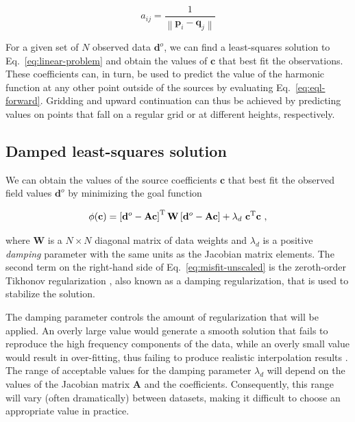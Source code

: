 \begin{equation}
    a_{ij} = \frac{1}{\left\lVert\mathbf{p}_i - \mathbf{q}_j\right\rVert}
\end{equation}

For a given set of $N$ observed data $\mathbf{d}^o$,
we can find a least-squares solution to
Eq.~\ref{eq:linear-problem} and obtain the values of
$\mathbf{c}$ that best fit the observations.
These coefficients can, in turn, be used to predict the value of the harmonic
function at any other point outside of the sources by evaluating
Eq.~\ref{eq:eql-forward}.
Gridding and upward continuation can thus be achieved by predicting values on
points that fall on a regular grid or at different heights, respectively.


\subsection{Damped least-squares solution}
\label{sec:eql_inversion}

We can obtain the values of the source coefficients $\mathbf{c}$ that best
fit the observed field values $\mathbf{d}^o$ by minimizing the goal function

\begin{equation}
    \phi(\mathbf{c}) =
    \left[\mathbf{d}^o - \mathbf{A}\mathbf{c}\right]^{\text{T}}
    \mathbf{W}
    \left[\mathbf{d}^o - \mathbf{A}\mathbf{c}\right]
    + \lambda_d\ \mathbf{c}^{\text{T}}\mathbf{c}
    \ ,
    \label{eq:misfit-unscaled}
\end{equation}

\noindent where
$\mathbf{W}$ is a $N \times N$ diagonal matrix of data weights and
$\lambda_d$ is a positive \emph{damping} parameter with the same units as the
Jacobian matrix elements.
The second term on the right-hand side of Eq.~\ref{eq:misfit-unscaled} is the
zeroth-order Tikhonov regularization \citep{tikhonov1977}, also known as a
damping regularization, that is used to stabilize the solution.

The damping parameter controls the amount of regularization that will be
applied.
An overly large value would generate a smooth solution that fails to reproduce
the high frequency components of the data, while an overly small value would
result in over-fitting, thus failing to produce realistic interpolation results
\citep{martinez2016}.
The range of acceptable values for the damping parameter $\lambda_d$ will
depend on the values of the Jacobian matrix $\mathbf{A}$ and the coefficients.
Consequently, this range will vary (often dramatically) between datasets,
making it difficult to choose an appropriate value in practice.


